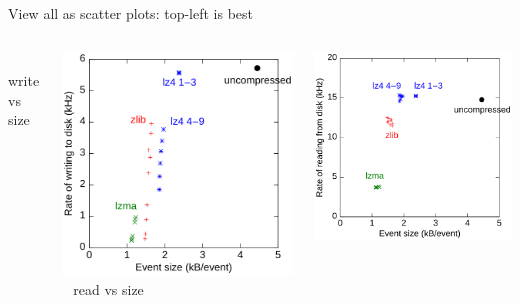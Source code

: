 \documentclass{beamer}
\begin{document}
\begin{frame}{View all as scatter plots: top-left is best}
\vspace{0.5 cm}
\begin{columns}
\mbox{ } \hfill write vs size \hfill \mbox{ }

\includegraphics[width=\linewidth]{write.png}
\vspace{3 cm}
\mbox{ } \hfill read vs size \hfill \mbox{ }

\includegraphics[width=\linewidth]{read.png}
\vspace{3 cm}


\end{columns}
\end{frame}
\end{document}
